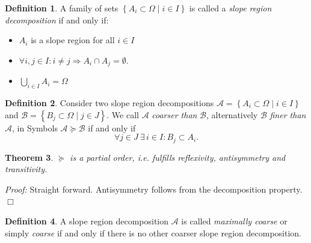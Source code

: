 \documentclass[11pt,twoside,twocolumn,a4paper]{article}
\theoremstyle{plain}
\newtheorem{thm}{Theorem}[section] %
\theoremstyle{definition}
\newtheorem{defn}[thm]{Definition} %
\begin{document}
\begin{defn}
A family of sets $\left\{ A_i \subset \Omega \mid i \in I \right\}$ is called a \emph{slope region decomposition} if and only if:
\begin{itemize}
\item $A_i$ is a slope region for all $i \in I$
\item $\forall i,j \in I: i \neq j \Rightarrow A_i \cap A_j = \emptyset$.
\item $\bigcup_{i\in I} A_i = \Omega$
\end{itemize}
\end{defn}



\begin{defn}
Consider two slope region decompositions $\mathcal{A} = \left\{ A_i \subset \Omega \mid i \in I \right\}$ and $\mathcal{B} = \left\{ B_j \subset \Omega \mid j \in J \right\}$.
We call $\mathcal{A}$ \emph{coarser than} $\mathcal{B}$, alternatively $\mathcal{B}$ \emph{finer than} $\mathcal{A}$, in Symbols $\mathcal{A} \succeq \mathcal{B}$ if and only if
\begin{equation*}
\forall j \in J ~ \exists \, i \in I: B_j \subset A_i.
\end{equation*}
\end{defn}

\begin{thm}
$\succeq$ is a partial order, i.e. fulfills reflexivity, antisymmetry and transitivity.
\end{thm}
\emph{Proof:} Straight forward. Antisymmetry follows from the decomposition property. \hfill $\Box$

\begin{defn}
A slope region decomposition $\mathcal{A}$ is called \emph{maximally coarse} or simply \emph{coarse} if and only if there is no other coarser slope region decomposition.
\end{defn}
\end{document}
